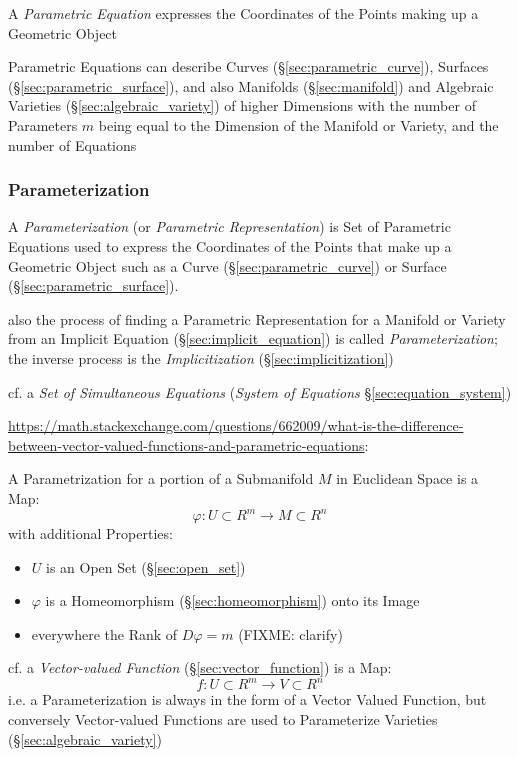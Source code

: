 A \emph{Parametric Equation} expresses the Coordinates of the Points making up a
Geometric Object

Parametric Equations can describe Curves (\S\ref{sec:parametric_curve}),
Surfaces (\S\ref{sec:parametric_surface}), and also Manifolds
(\S\ref{sec:manifold}) and Algebraic Varieties (\S\ref{sec:algebraic_variety})
of higher Dimensions with the number of Parameters $m$ being equal to the
Dimension of the Manifold or Variety, and the number of Equations



\subsubsection{Parameterization}\label{sec:parameterization}

A \emph{Parameterization} (or \emph{Parametric Representation}) is Set of
Parametric Equations used to express the Coordinates of the Points that make up
a Geometric Object such as a Curve (\S\ref{sec:parametric_curve}) or Surface
(\S\ref{sec:parametric_surface}).

also the process of finding a Parametric Representation for a Manifold or
Variety from an Implicit Equation (\S\ref{sec:implicit_equation}) is called
\emph{Parameterization}; the inverse process is the \emph{Implicitization}
(\S\ref{sec:implicitization})

cf. a \emph{Set of Simultaneous Equations} (\emph{System of Equations}
\S\ref{sec:equation_system})

\url{https://math.stackexchange.com/questions/662009/what-is-the-difference-between-vector-valued-functions-and-parametric-equations}:

A Parametrization for a portion of a Submanifold $M$ in Euclidean Space is a
Map:
\[
  \varphi : U \subset R^m \rightarrow M \subset R^n
\]
with additional Properties:
\begin{itemize}
  \item $U$ is an Open Set (\S\ref{sec:open_set})
  \item $\varphi$ is a Homeomorphism (\S\ref{sec:homeomorphism}) onto its Image
  \item everywhere the Rank of $D\varphi = m$ (FIXME: clarify)
\end{itemize}

\fist cf. a \emph{Vector-valued Function} (\S\ref{sec:vector_function}) is a
Map:
\[
  f : U \subset R^m \rightarrow V \subset R^n
\]
i.e. a Parameterization is always in the form of a Vector Valued Function, but
conversely Vector-valued Functions are used to Parameterize Varieties
(\S\ref{sec:algebraic_variety}) %



